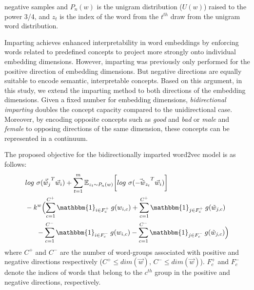 \documentclass[11pt,a4paper]{article}
\newcommand{\indicator}{\ensuremath{\mathbbm{1}}}
\begin{document}
negative samples and $P_n(w)$ is the unigram distribution
($U(w)$) raised to the power 3/4, and $z_t$ is the index of the word from the $t^{th}$ draw from the unigram word distribution.

Imparting achieves enhanced interpretability in word
embeddings by enforcing words related to predefined concepts
to project more strongly onto individual embedding
dimensions. However, imparting was previously only performed
for the positive direction of embedding dimensions.
But negative directions are equally suitable to encode semantic, interpretable concepts. Based on this argument, in this study, we extend the imparting method to both directions of the embedding dimensions. 
Given a fixed number for embedding dimensions, \textit{bidirectional imparting} doubles the concept capacity compared to the unidirectional case. Moreover, by encoding opposite concepts such as \textit{good} and \textit{bad} or \textit{male} and \textit{female} to opposing directions of the same dimension, these concepts can be represented in a continuum.

The proposed objective for the bidirectionally imparted word2vec model is as follows:
\begin{align}
\begin{split}
& log ~ \sigma ({\vec{\tilde{w}}_{j}}^T \vec{w}_{i}) + \sum_{t = 1}^{m} {\mathbb{E}}_{z_t \sim P_n(w)} \bigg[ log ~ \sigma({\vec{-\tilde{w}}_{z_t}}^T \vec{w}_{i}) \bigg] \\ 
& -k^w \Bigl(  \sum_{c=1}^{C^+} \indicator_{i\in{}F^+_c} \: g(w_{i,c}) + \sum_{c=1}^{C^+} \indicator_{j \in F^+_c} \: g(\tilde{w}_{j,c}) \\
& ~~~~~ - \sum_{c=1}^{C^-} \indicator_{i\in{}F^-_c} \: g(w_{i,c}) - \sum_{c=1}^{C^-} \indicator_{j \in F^-_c} \: g(\tilde{w}_{j,c}) \Bigr)
\end{split}
\label{eq:word2vec_bi}
\end{align}
where $C^+$ and $C^-$ are the number of word-groups associated with positive and negative directions respectively ($C^+ \leq dim(\vec{w})$, $C^- \leq dim(\vec{w})$). $F^+_c$ and $F^-_c$ denote the indices of words that belong to the $c^{th}$ group in the positive and negative directions, respectively. 
\end{document}
